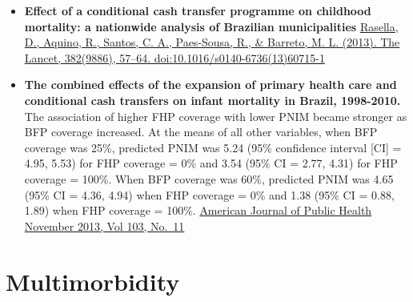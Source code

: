 \documentclass[]{book}
\begin{document}
\begin{itemize}
\item
  \textbf{Effect of a conditional cash transfer programme on childhood mortality: a nationwide analysis of Brazilian municipalities} \href{https://sci-hub.tw/https://doi.org/10.1016/S0140-6736(13)60715-1}{Rasella, D., Aquino, R., Santos, C. A., Paes-Sousa, R., \& Barreto, M. L. (2013). The Lancet, 382(9886), 57--64. doi:10.1016/s0140-6736(13)60715-1}
\item
  \textbf{The combined effects of the expansion of primary health care and conditional cash transfers on infant mortality in Brazil, 1998-2010.} The association of higher FHP coverage with lower PNIM became stronger as BFP coverage increased. At the means of all other variables, when BFP coverage was 25\%, predicted PNIM was 5.24 (95\% confidence interval {[}CI{]} = 4.95, 5.53) for FHP coverage = 0\% and 3.54 (95\% CI = 2.77, 4.31) for FHP coverage = 100\%. When BFP coverage was 60\%, predicted PNIM was 4.65 (95\% CI = 4.36, 4.94) when FHP coverage = 0\% and 1.38 (95\% CI = 0.88, 1.89) when FHP coverage = 100\%. \href{https://www.ncbi.nlm.nih.gov/pmc/articles/PMC3828713/pdf/AJPH.2013.301452.pdf}{American Journal of Public Health \textbar{} November 2013, Vol 103, No.~11}
\end{itemize}

\hypertarget{multimorbidity}{%
\section*{Multimorbidity}\label{multimorbidity}}
\end{document}

